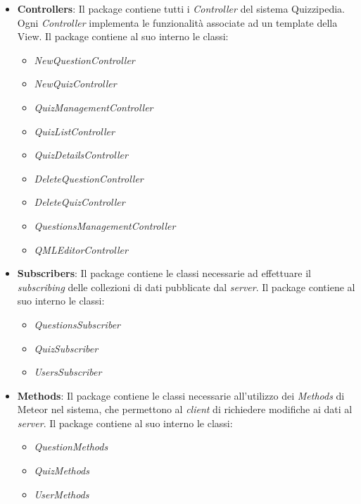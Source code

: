 	\begin{itemize}
	\item \textbf{Controllers}: Il package contiene tutti i \emph{Controller} del sistema Quizzipedia. Ogni \emph{Controller} implementa le funzionalità associate ad un template della View.
	Il package contiene al suo interno le classi:
	\begin{itemize}
		\item \textit{NewQuestionController}
		\item \textit{NewQuizController}
		\item \textit{QuizManagementController}
		\item \textit{QuizListController}
		\item \textit{QuizDetailsController}
		\item \textit{DeleteQuestionController}
		\item \textit{DeleteQuizController}
		\item \textit{QuestionsManagementController}
		\item \textit{QMLEditorController}
	\end{itemize}	
	
	\item \textbf{Subscribers}: Il package contiene le classi necessarie ad effettuare il \emph{subscribing} delle collezioni di dati pubblicate dal \emph{server}.
	Il package contiene al suo interno le classi:
	\begin{itemize}
		\item \textit{QuestionsSubscriber}
		\item \textit{QuizSubscriber}
		\item \textit{UsersSubscriber}
	\end{itemize}
	
	\item \textbf{Methods}: Il package contiene le classi necessarie all'utilizzo dei \emph{Methods} di Meteor nel sistema, che permettono al \emph{client} di richiedere modifiche ai dati al \emph{server}.
	Il package contiene al suo interno le classi:
	\begin{itemize}
		\item \textit{QuestionMethods}
		\item \textit{QuizMethods}
		\item \textit{UserMethods}
	\end{itemize}		
	

\end{itemize}
